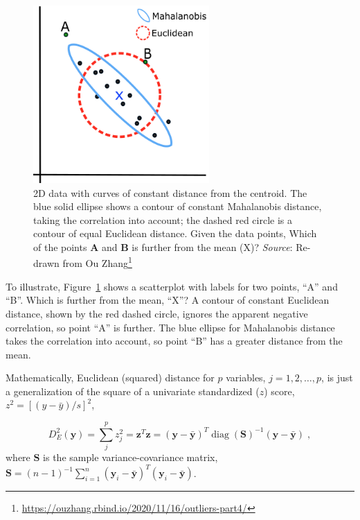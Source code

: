 \documentclass[
  letterpaper,
  10pt,
  krantz2]{krantz}
\providecommand{\href}[2]{#2\footnote{\url{#1}}}
\begin{document}
\begin{figure}

{\centering \includegraphics[width=0.6\textwidth,height=\textheight]{images/mahalanobis.png}

}

\caption{\label{fig-mahalanobis}2D data with curves of constant distance
from the centroid. The blue solid ellipse shows a contour of constant
Mahalanobis distance, taking the correlation into account; the dashed
red circle is a contour of equal Euclidean distance. Given the data
points, Which of the points \textbf{A} and \textbf{B} is further from
the mean (X)? \emph{Source}: Re-drawn from
\href{https://ouzhang.rbind.io/2020/11/16/outliers-part4/}{Ou Zhang}}

\end{figure}

To illustrate, Figure~\ref{fig-mahalanobis} shows a scatterplot with
labels for two points, ``A'' and ``B''. Which is further from the mean,
``X''? A contour of constant Euclidean distance, shown by the red dashed
circle, ignores the apparent negative correlation, so point ``A'' is
further. The blue ellipse for Mahalanobis distance takes the correlation
into account, so point ``B'' has a greater distance from the mean.

Mathematically, Euclidean (squared) distance for \(p\) variables,
\(j = 1, 2, \dots , p\), is just a generalization of the square of a
univariate standardized (\(z\)) score, \(z^2 = [(y - \bar{y}) / s]^2\),

\[
D_E^2 (\mathbf{y}) = \sum_j^p z_j^2 = \mathbf{z}^T  \mathbf{z} = (\mathbf{y} - \bar{\mathbf{y}})^T \operatorname{diag}(\mathbf{S})^{-1} (\mathbf{y} - \bar{\mathbf{y}}) \; ,
\] where \(\mathbf{S}\) is the sample variance-covariance matrix,
\(\mathbf{S} = ({n-1})^{-1} \sum_{i=1}^n (\mathbf{y}_i - \bar{\mathbf{y}})^T (\mathbf{y}_i - \bar{\mathbf{y}})\).
\end{document}
